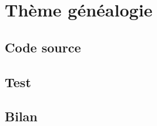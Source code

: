 
\section{Thème généalogie}

    \subsection{Code source}

        


    \subsection{Test}

    
    \subsection{Bilan}
